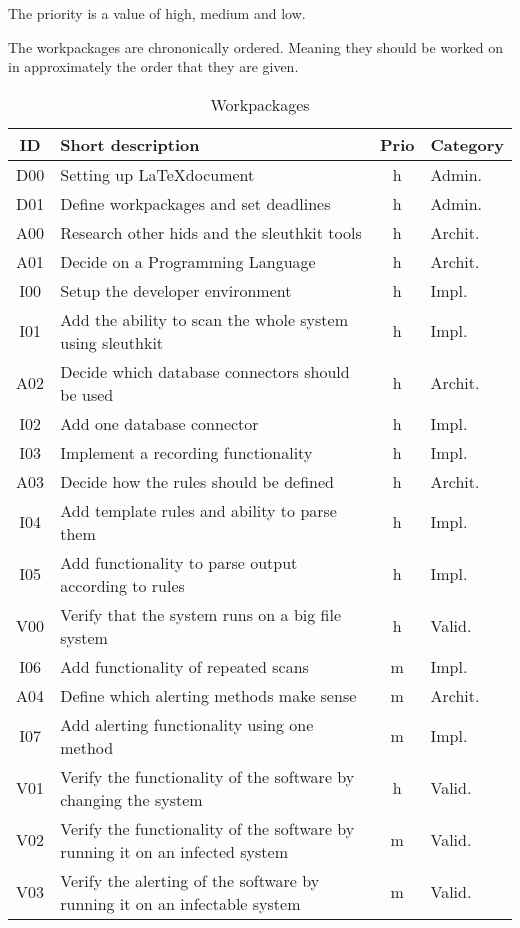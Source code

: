 The priority is a value of high, medium and low. 

The workpackages are chrononically ordered. Meaning they should be worked on in approximately the order that they are given. 

\begin{table}[!ht]
  \begin{center}
    \caption{Workpackages}
    \label{tab:workpackages}
    \begin{tabular}{c|l|c|l}
      \textbf{ID} & \textbf{Short description} & \textbf{Prio} & \textbf{Category} \\
      \hline
		D00 & Setting up \LaTeX document & h & Admin. \\
		D01 & Define workpackages and set deadlines & h & Admin. \\
		A00 & Research other \gls{hids} and the sleuthkit tools & h & Archit. \\
		A01 & Decide on a Programming Language & h & Archit. \\
		I00 & Setup the developer environment & h & Impl. \\
		I01 & Add the ability to scan the whole system using sleuthkit & h & Impl. \\
		A02 & Decide which database connectors should be used & h & Archit. \\
		I02 & Add one database connector & h & Impl. \\
		I03 & Implement a recording functionality & h & Impl. \\
		A03 & Decide how the rules should be defined & h & Archit. \\
		I04 & Add template rules and ability to parse them & h & Impl. \\
		I05 & Add functionality to parse output according to rules & h & Impl. \\
		V00 & Verify that the system runs on a big file system & h & Valid. \\
		I06 & Add functionality of repeated scans & m & Impl. \\
		A04 & Define which alerting methods make sense & m & Archit. \\ 
		I07 & Add alerting functionality using one method & m & Impl. \\
		V01 & Verify the functionality of the software by changing the system & h & Valid. \\
		V02 & Verify the functionality of the software by running it on an infected system & m & Valid. \\
		V03 & Verify the alerting of the software by running it on an infectable system & m & Valid. \\

\end{tabular}
\end{center}
\end{table}

